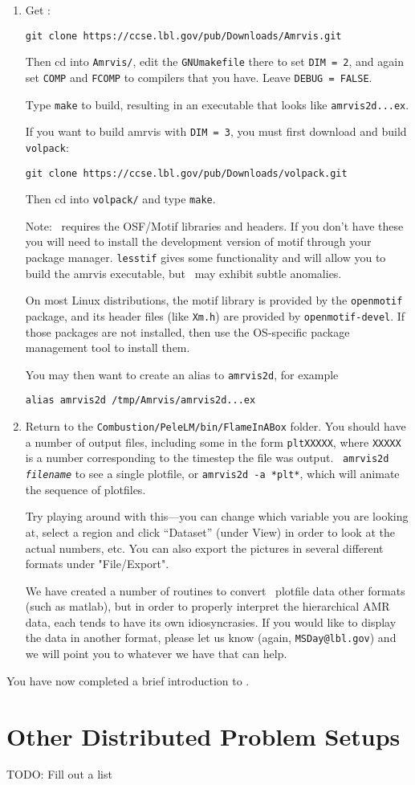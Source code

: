 \begin{enumerate}

\item Get \amrvis:
\begin{verbatim}
git clone https://ccse.lbl.gov/pub/Downloads/Amrvis.git
\end{verbatim}

Then cd into {\tt Amrvis/}, edit the {\tt GNUmakefile} there
to set {\tt DIM = 2}, and again set {\tt COMP} and {\tt FCOMP} to compilers that
you have. Leave {\tt DEBUG = FALSE}.

Type {\tt make} to build, resulting in an executable that
looks like {\tt amrvis2d...ex}.

If you want to build amrvis with {\tt DIM = 3}, you must first
download and build {\tt volpack}:
\begin{verbatim}
git clone https://ccse.lbl.gov/pub/Downloads/volpack.git
\end{verbatim}

Then cd into {\tt volpack/} and type {\tt make}.

Note: \amrvis\ requires the OSF/Motif libraries and headers. If you don't have these 
you will need to install the development version of motif through your package manager. 
{\tt lesstif} gives some functionality and will allow you to build the amrvis executable, 
but \amrvis\ may exhibit subtle anomalies.

On most Linux distributions, the motif library is provided by the
{\tt openmotif} package, and its header files (like {\tt Xm.h}) are provided
by {\tt openmotif-devel}. If those packages are not installed, then use the
OS-specific package management tool to install them. 

You may then want to create an alias to {\tt amrvis2d}, for example
\begin{verbatim}
alias amrvis2d /tmp/Amrvis/amrvis2d...ex
\end{verbatim}

\item Return to the {\tt Combustion/PeleLM/bin/FlameInABox} folder.  You should
  have a number of output files, including some in the form {\tt *pltXXXXX},
  where {\tt XXXXX} is a number corresponding to the timestep the file
  was output.  {\tt
    amrvis2d {\em filename}} to see a single plotfile, or {\tt amrvis2d -a
  *plt*}, which will animate the sequence of plotfiles.

  Try playing
  around with this---you can change which variable you are
  looking at, select a region and click ``Dataset'' (under View)
  in order to look at the actual numbers, etc. You can also export the
  pictures in several different formats under "File/Export".

We have created a number of routines to convert \amrex\ plotfile data
other formats (such as matlab), but in order to properly interpret 
the hierarchical AMR data, each tends to have its own idiosyncrasies.
If you would like to display the data in another format, please let us know
(again, {\tt MSDay@lbl.gov}) and we will point you to whatever we have
that can help.

\end{enumerate}

You have now completed a brief introduction to \pelelm. 


\section{Other Distributed Problem Setups}

TODO: Fill out a list
